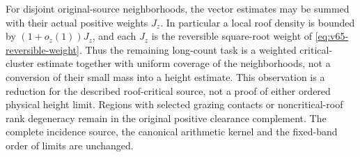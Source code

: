 For disjoint original-source neighborhoods, the vector estimates may
be summed with their actual positive weights $J_z$. In particular a
local roof density is bounded by $(1+o_z(1))J_z$, and each $J_z$ is
the reversible square-root weight of
\eqref{eq:v65-reversible-weight}. Thus the remaining long-count task
is a weighted critical-cluster estimate together with uniform coverage
of the neighborhoods, not a conversion of their small mass into a
height estimate. This observation is a reduction for the described
roof-critical source, not a proof of either ordered physical height
limit. Regions with selected grazing contacts or noncritical-roof
rank degeneracy remain in the original positive clearance complement.
The complete incidence source, the canonical arithmetic kernel and
the fixed-band order of limits are unchanged.

\label{end:v65-new-mathematics}
